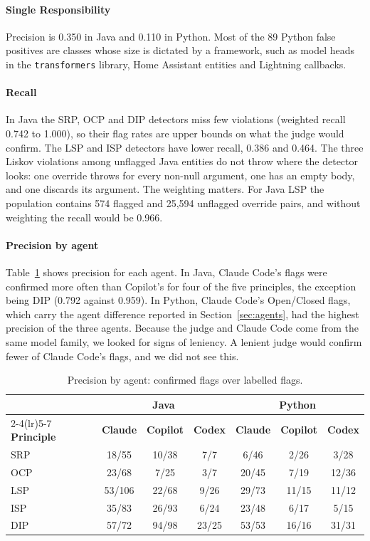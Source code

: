 \documentclass[sigconf]{acmart}
\begin{document}
\paragraph{Single Responsibility} Precision is 0.350 in Java and 0.110 in Python. Most of the 89
Python false positives are classes whose size is dictated by a framework, such as model heads in the
\texttt{transformers} library, Home Assistant entities and Lightning callbacks.

\paragraph{Recall} In Java the SRP, OCP and DIP detectors miss few violations (weighted recall 0.742
to 1.000), so their flag rates are upper bounds on what the judge would confirm. The LSP and ISP
detectors have lower recall, 0.386 and 0.464. The three Liskov violations among unflagged Java
entities do not throw where the detector looks: one override throws for every non-null argument,
one has an empty body, and one discards its argument. The weighting matters. For Java LSP the
population contains 574 flagged and 25,594 unflagged override pairs, and without weighting the
recall would be 0.966.

\paragraph{Precision by agent} Table~\ref{tab:agentprec} shows precision for each agent. In Java,
Claude Code's flags were confirmed more often than Copilot's for four of the five principles, the
exception being DIP (0.792 against 0.959). In Python, Claude Code's Open/Closed flags, which carry the
agent difference reported in Section~\ref{sec:agents}, had the highest precision of the three
agents. Because the judge
and Claude Code come from the same model family, we looked for signs of leniency. A lenient judge
would confirm fewer of Claude Code's flags, and we did not see this.

\begin{table}[t]
\caption{Precision by agent: confirmed flags over labelled flags.}
\label{tab:agentprec}
\footnotesize
\setlength{\tabcolsep}{3.4pt}
\begin{tabular}{@{}lcccccc@{}}
\toprule
 & \multicolumn{3}{c}{\textbf{Java}} & \multicolumn{3}{c}{\textbf{Python}} \\
\cmidrule(lr){2-4}\cmidrule(lr){5-7}
\textbf{Principle} & \textbf{Claude} & \textbf{Copilot} & \textbf{Codex} & \textbf{Claude} & \textbf{Copilot} & \textbf{Codex} \\
\midrule
SRP & 18/55  & 10/38 & 7/7   & 6/46  & 2/26  & 3/28 \\
OCP & 23/68  & 7/25  & 3/7   & 20/45 & 7/19  & 12/36 \\
LSP & 53/106 & 22/68 & 9/26  & 29/73 & 11/15 & 11/12 \\
ISP & 35/83  & 26/93 & 6/24  & 23/48 & 6/17  & 5/15 \\
DIP & 57/72  & 94/98 & 23/25 & 53/53 & 16/16 & 31/31 \\
\bottomrule
\end{tabular}
\end{table}
\end{document}

